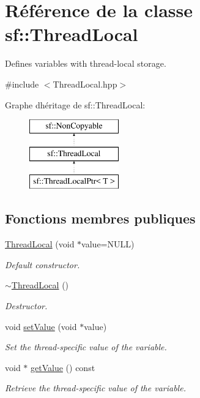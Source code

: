 \hypertarget{classsf_1_1ThreadLocal}{}\section{Référence de la classe sf\+:\+:Thread\+Local}
\label{classsf_1_1ThreadLocal}


Defines variables with thread-\/local storage.  




{\ttfamily \#include $<$Thread\+Local.\+hpp$>$}

Graphe d\textquotesingle{}héritage de sf\+:\+:Thread\+Local\+:\begin{figure}[H]
\begin{center}
\leavevmode
\includegraphics[height=3.000000cm]{classsf_1_1ThreadLocal}
\end{center}
\end{figure}
\subsection*{Fonctions membres publiques}
\begin{DoxyCompactItemize}
\item 
\hyperlink{classsf_1_1ThreadLocal_a44ea3c4be4eef118080275cbf4cf04cd}{Thread\+Local} (void $\ast$value=N\+U\+LL)
\begin{DoxyCompactList}\small\item\em Default constructor. \end{DoxyCompactList}\item 
\mbox{\label{classsf_1_1ThreadLocal_acc612bddfd0f0507b1c5da8b3b8c75c2}} 
\hyperlink{classsf_1_1ThreadLocal_acc612bddfd0f0507b1c5da8b3b8c75c2}{$\sim$\+Thread\+Local} ()
\begin{DoxyCompactList}\small\item\em Destructor. \end{DoxyCompactList}\item 
void \hyperlink{classsf_1_1ThreadLocal_ab7e334c83d77644a8e67ee31c3230007}{set\+Value} (void $\ast$value)
\begin{DoxyCompactList}\small\item\em Set the thread-\/specific value of the variable. \end{DoxyCompactList}\item 
void $\ast$ \hyperlink{classsf_1_1ThreadLocal_ad68823496eb065b4b695c3468fa869bc}{get\+Value} () const
\begin{DoxyCompactList}\small\item\em Retrieve the thread-\/specific value of the variable. \end{DoxyCompactList}\end{DoxyCompactItemize}


